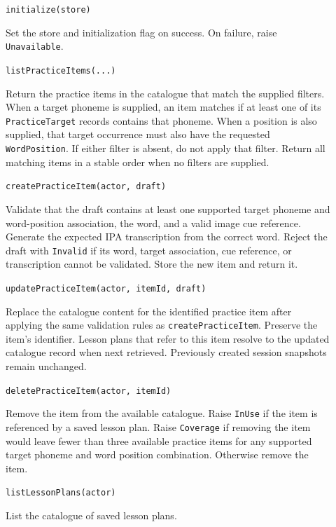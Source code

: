 \documentclass[12pt, titlepage]{article}
\begin{document}
\begin{description}
\item[] \texttt{initialize(store)}\par
Set the store and initialization flag on
success. On failure, raise \texttt{Unavailable}.

\item[] \texttt{listPracticeItems(...)}\par
Return the practice items in the catalogue that match the supplied filters.
When a target phoneme is supplied, an item matches if at least one of its
\texttt{PracticeTarget} records contains that phoneme. When a position is
also supplied, that target occurrence must also have the requested
\texttt{WordPosition}. If either filter is absent, do not apply that filter.
Return all matching items in a stable order when no filters are supplied.

\item[] \texttt{createPracticeItem(actor, draft)}\par
Validate that the draft contains at least one supported target phoneme and
word-position association, the word, and a valid image cue
reference. Generate the expected IPA
transcription from the correct word. Reject the draft with \texttt{Invalid}
if its word, target association, cue reference, or transcription cannot be
validated. Store the new item and return it.

\item[] \texttt{updatePracticeItem(actor, itemId, draft)}\par
Replace the catalogue content for the identified practice item after applying
the same validation rules as
\texttt{createPracticeItem}. Preserve the item's identifier. Lesson plans
that refer to this item resolve to the updated catalogue record when next
retrieved. Previously created session snapshots remain unchanged.

\item[] \texttt{deletePracticeItem(actor, itemId)}\par
Remove the item from the available catalogue. Raise \texttt{InUse} if the
item is referenced by a saved lesson plan. Raise
\texttt{Coverage} if removing the item would leave fewer than
three available practice items for any supported target phoneme and word
position combination. Otherwise remove the item.

\item[] \texttt{listLessonPlans(actor)}\par
List the catalogue of saved lesson plans.


\end{description}
\end{document}
